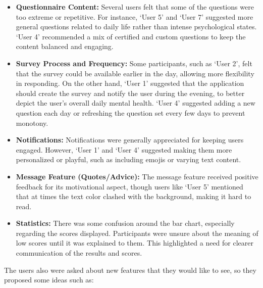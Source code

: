 \begin{itemize}
    \item \textbf{Questionnaire Content:} Several users felt that some of the questions were too extreme or repetitive. For instance, `User 5' and `User 7' suggested more general questions related to daily life rather than intense psychological states. `User 4' recommended a mix of certified and custom questions to keep the content balanced and engaging.

    \item \textbf{Survey Process and Frequency:} Some participants, such as `User 2', felt that the survey could be available earlier in the day, allowing more flexibility in responding. On the other hand, `User 1' suggested that the application should create the survey and notify the user during the evening, to better depict the user's overall daily mental health. `User 4' suggested adding a new question each day or refreshing the question set every few days to prevent monotony.

    \item \textbf{Notifications:} Notifications were generally appreciated for keeping users engaged. However, `User 1' and `User 4' suggested making them more personalized or playful, such as including emojis or varying text content.

    \item \textbf{Message Feature (Quotes/Advice):} The message feature received positive feedback for its motivational aspect, though users like `User 5' mentioned that at times the text color clashed with the background, making it hard to read.

    \item \textbf{Statistics:} There was some confusion around the bar chart, especially regarding the scores displayed. Participants were unsure about the meaning of low scores until it was explained to them. This highlighted a need for clearer communication of the results and scores.
\end{itemize}

\noindent The users also were asked about new features that they would like to see, so they proposed some ideas such as:


